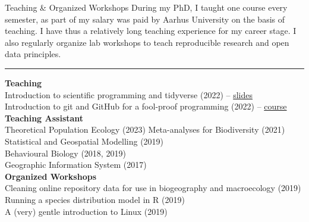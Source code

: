 \documentclass{resume} %
\newcommand{\spazio}{\begin{center} \par\noindent\rule{0.2\textwidth}{0.4pt} \end{center}}
\begin{document}
\begin{rSection}{Teaching \& Organized Workshops}
During my PhD, I taught one course every semester, as part of my salary was paid by Aarhus University on the basis of teaching.
I have thus a relatively long teaching experience for my career stage.
I also regularly organize lab workshops to teach reproducible research and open data principles.

\spazio

{\bf Teaching} \\
Introduction to scientific programming and tidyverse (2022) -- \href{https://emilio-berti.github.io/teaching/tidyverse.html#(1)}{slides}\\
Introduction to git and GitHub for a fool-proof programming (2022) -- \href{https://emilio-berti.github.io/idiv-git-introduction/}{course}\\
{\bf Teaching Assistant} \\
Theoretical Population Ecology (2023)
Meta-analyses for Biodiversity (2021)\\
Statistical and Geospatial Modelling (2019)\\
Behavioural Biology (2018, 2019)\\
Geographic Information System (2017)\\
{\bf Organized Workshops}\\
Cleaning online repository data for use in biogeography and macroecology (2019)\\
Running a species distribution model in R (2019)\\
A (very) gentle introduction to Linux (2019)
\end{rSection}
\end{document}
